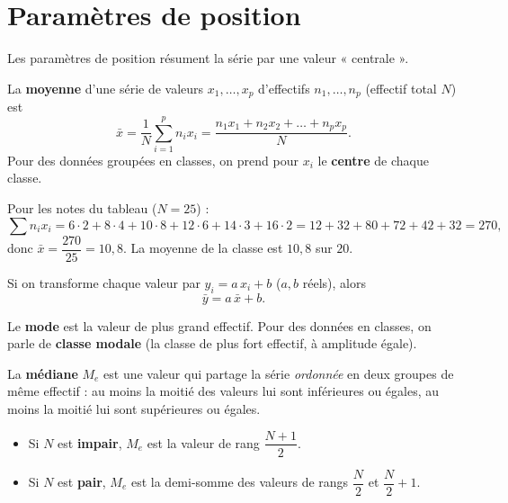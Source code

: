 \section{Paramètres de position}

Les paramètres de position résument la série par une valeur « centrale ».

\begin{definition}
La \textbf{moyenne} d'une série de valeurs $x_1,\dots,x_p$ d'effectifs
$n_1,\dots,n_p$ (effectif total $N$) est
\[ \bar x = \frac{1}{N}\sum_{i=1}^{p} n_i x_i
   = \frac{n_1x_1+n_2x_2+\dots+n_px_p}{N}. \]
Pour des données groupées en classes, on prend pour $x_i$ le \textbf{centre} de
chaque classe.
\end{definition}

\begin{exemple}
Pour les notes du tableau ($N=25$) :
\[ \sum n_i x_i = 6\cdot2+8\cdot4+10\cdot8+12\cdot6+14\cdot3+16\cdot2
   = 12+32+80+72+42+32 = 270, \]
donc $\bar x = \dfrac{270}{25} = 10{,}8$. La moyenne de la classe est $10{,}8$ sur $20$.
\end{exemple}

\begin{propriete}
Si on transforme chaque valeur par $y_i = a\,x_i + b$ ($a,b$ réels), alors
\[ \bar y = a\,\bar x + b. \]
\end{propriete}

\begin{definition}[Mode]
Le \textbf{mode} est la valeur de plus grand effectif. Pour des données en classes,
on parle de \textbf{classe modale} (la classe de plus fort effectif, à amplitude
égale).
\end{definition}

\begin{definition}[Médiane]
La \textbf{médiane} $M_e$ est une valeur qui partage la série \emph{ordonnée} en deux
groupes de même effectif : au moins la moitié des valeurs lui sont inférieures ou
égales, au moins la moitié lui sont supérieures ou égales.
\begin{itemize}
  \item Si $N$ est \textbf{impair}, $M_e$ est la valeur de rang $\dfrac{N+1}{2}$.
  \item Si $N$ est \textbf{pair}, $M_e$ est la demi-somme des valeurs de rangs
        $\dfrac{N}{2}$ et $\dfrac{N}{2}+1$.
\end{itemize}
\end{definition}

